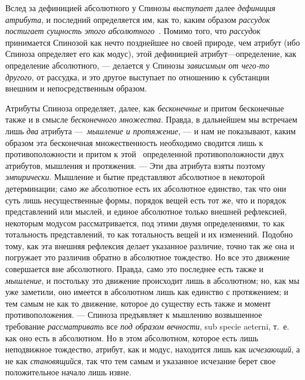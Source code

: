Вслед за дефиницией абсолютного у Спинозы
{\em выступает} далее
{\em дефиниция атрибута}, и последний определяется им,
как то, каким образом {\em рассудок постигает сущность
этого
абсолютного}~\textstyleEndnodeLink{(\ref{bkm:Ref474669634}}\label{bkm:bm92}\textstyleEndnodeLink{)}.
Помимо того, что {\em рассудок} принимается Спинозой
как нечто позднейшее но своей природе, чем атрибут (ибо Спиноза определяет
его как модус), этой дефиницией атрибут—определение, как определение
абсолютного, — делается у Спинозы {\em зависимым от
чего-то другого}, от рассудка, и это другое выступает по отношению к
субстанции внешним и непосредственным образом.

Атрибуты Спиноза определяет, далее, как
{\em бесконечные} и притом бесконечные также и в смысле
{\em бесконечного множества}. Правда, в дальнейшем мы
встречаем лишь {\em два} атрибута
—~{\em мышление и протяжение}, — и нам не показывают,
каким образом эта бесконечная множественность необходимо сводится лишь к
противоположности и притом к этой \ определенной противоположности двух
атрибутов, мышления и протяжения. — Эти два атрибута взяты поэтому
{\em эмпирически}. Мышление и бытие представляют
абсолютное в некоторой детерминации; само же абсолютное есть их абсолютное
единство, так что они суть лишь несущественные формы, порядок вещей есть
тот же, что и порядок представлений или мыслей, и единое абсолютное только
внешней рефлексией, некоторым модусом рассматривается, под этими двумя
определениями, то как тотальность представлений, то как тотальность вещей и
их изменений. Подобно тому, как эта внешняя рефлексия делает указанное
различие, точно так же она и погружает это различив обратно в абсолютное
тождество. Но все это движение совершается вне абсолютного. Правда, само
это последнее есть также и {\em мышление}, и постольку
это движение происходит лишь в абсолютном; но, как мы уже заметили, оно
имеется в абсолютном лишь как единство с протяжением; и тем самым не как то
движение, которое до существу есть также и момент противоположения. —
Спиноза предъявляет к мышлению возвышенное требование
{\em рассматривать} все {\em под
образом вечности}, sub specie aeterni, т.~е. как оно есть в абсолютном. Но
в этом абсолютном, которое есть лишь неподвижное тождество, атрибут, как и
модус, находится лишь как {\em исчезающий}, а не как
{\em становящийся}, так что тем самым и указанное
исчезание берет свое положительное начало лишь извне.

